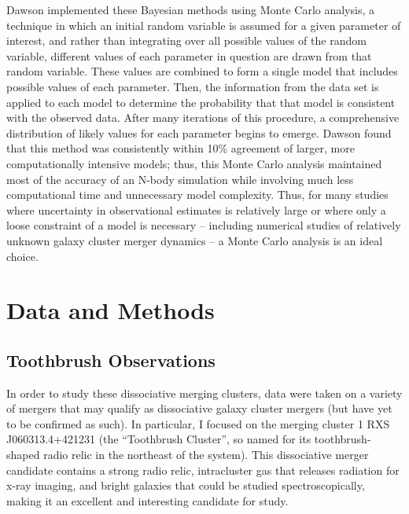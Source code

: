 \documentclass[12 pt]{article}
\begin{document}
Dawson implemented these Bayesian methods using Monte Carlo analysis, a technique in which an initial random variable is assumed for a given parameter of interest, and rather than integrating over all possible values of the random variable, different values of each parameter in question are drawn from that random variable. These values are combined to form a single model that includes possible values of each parameter. Then, the information from the data set is applied to each model to determine the probability that that model is consistent with the observed data. After many iterations of this procedure, a comprehensive distribution of likely values for each parameter begins to emerge. Dawson found that this method was consistently within 10\% agreement of larger, more computationally intensive models; thus, this Monte Carlo analysis maintained most of the accuracy of an N-body simulation while involving much less computational time and unnecessary model complexity. Thus, for many studies where uncertainty in observational estimates is relatively large or where only a loose constraint of a model is necessary – including numerical studies of relatively unknown galaxy cluster merger dynamics – a Monte Carlo analysis is an ideal choice.

\newpage
\section{Data and Methods}
\subsection{Toothbrush Observations}

In order to study these dissociative merging clusters, data were taken on a variety of mergers that may qualify as dissociative galaxy cluster mergers (but have yet to be confirmed as such). In particular, I focused on the merging cluster 1 RXS J060313.4+421231 (the “Toothbrush Cluster”, so named for its toothbrush-shaped radio relic in the northeast of the system). This dissociative merger candidate contains a strong radio relic, intracluster gas that releases radiation for x-ray imaging, and bright galaxies that could be studied spectroscopically, making it an excellent and interesting candidate for study. 
\end{document}
